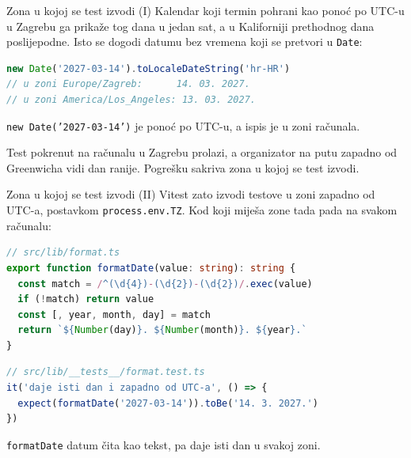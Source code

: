 \begin{frame}[fragile]{Zona u kojoj se test izvodi (I)}
Kalendar koji termin pohrani kao ponoć po UTC-u u Zagrebu ga prikaže tog dana u jedan sat, a u Kaliforniji prethodnog dana poslijepodne. Isto se dogodi datumu bez vremena koji se pretvori u \texttt{Date}:

\begin{lstlisting}[language=typescript, keepspaces=true]
new Date('2027-03-14').toLocaleDateString('hr-HR')
// u zoni Europe/Zagreb:      14. 03. 2027.
// u zoni America/Los_Angeles: 13. 03. 2027.
\end{lstlisting}

\vspace{0.4em}
\texttt{new Date('2027-03-14')} je ponoć po UTC-u, a ispis je u zoni računala.

\vspace{0.4em}
Test pokrenut na računalu u Zagrebu prolazi, a organizator na putu zapadno od Greenwicha vidi dan ranije. Pogrešku sakriva zona u kojoj se test izvodi.
\end{frame}

\begin{frame}[fragile]{Zona u kojoj se test izvodi (II)}
Vitest zato izvodi testove u zoni zapadno od UTC-a, postavkom \texttt{process.env.TZ}. Kod koji miješa zone tada pada na svakom računalu:

\begin{lstlisting}[language=typescript]
// src/lib/format.ts
export function formatDate(value: string): string {
  const match = /^(\d{4})-(\d{2})-(\d{2})/.exec(value)
  if (!match) return value
  const [, year, month, day] = match
  return `${Number(day)}. ${Number(month)}. ${year}.`
}
\end{lstlisting}

\vspace{-0.2em}
\begin{lstlisting}[language=typescript]
// src/lib/__tests__/format.test.ts
it('daje isti dan i zapadno od UTC-a', () => {
  expect(formatDate('2027-03-14')).toBe('14. 3. 2027.')
})
\end{lstlisting}

\vspace{0.2em}
\texttt{formatDate} datum čita kao tekst, pa daje isti dan u svakoj zoni.
\end{frame}

